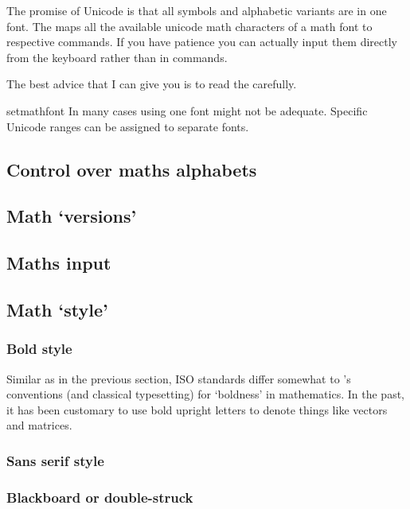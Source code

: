 The promise of Unicode is that all symbols and alphabetic variants are in one font. The 
maps all the available unicode math characters of a math font to respective \latex commands. If you have patience you can actually input them directly from the keyboard rather than in commands.

The best advice that I can give you is to read the  carefully. 

\begin{docCommand} {setmathfont} {   }
In many cases using one font might not be adequate. Specific Unicode ranges can be assigned to separate fonts.
\end{docCommand}

\subsection{Control over maths alphabets}

\subsection{Math `versions'}

\subsection{Maths input}

\subsection{Math `style'}

\subsubsection{Bold style}

Similar as in the previous section, ISO standards differ somewhat to \tex’s conventions
(and classical typesetting) for ‘boldness’ in mathematics. In the past, it has
been customary to use bold upright letters to denote things like vectors and matrices.

\subsubsection{Sans serif style}

\subsubsection{Blackboard or double-struck}

